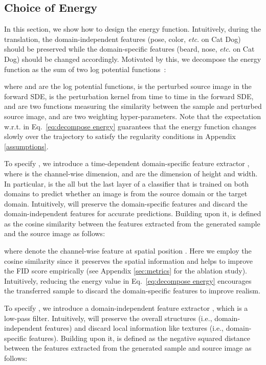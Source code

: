 \documentclass{article}
\begin{document}
\subsection{Choice of Energy}
\label{choice of energy}





In this section, we show how to design the energy function. Intuitively, during the translation, the domain-independent features (pose, color, \emph{etc}. on Cat  Dog) should be preserved while the domain-specific features (beard, nose, \emph{etc}. on Cat  Dog) should be changed  accordingly. Motivated by this, we decompose the energy function  as the sum of two log potential functions~\cite{bishop:2006:PRML}: 

where  and  are the log potential functions,  is the perturbed source image in the forward SDE, 
 is the perturbation kernel from time  to time  in the forward SDE,    and
 are two functions measuring the similarity between the sample and perturbed source image,
and  are two weighting hyper-parameters. Note that
the expectation w.r.t.   in Eq.~\eqref{eq:decompose energy} guarantees that the energy function changes slowly over the trajectory to satisfy the regularity conditions in Appendix \ref{assumptions}. 


To specify 
, we introduce a time-dependent domain-specific feature extractor , where  is the channel-wise dimension,  and  are the dimension of height and width.
In particular,  is the all but the last layer of a classifier that is trained on both domains to predict whether an image is from the source domain or the target domain. Intuitively,   will preserve the domain-specific features and discard the domain-independent features for accurate predictions. Building upon it,  is defined as the cosine similarity between the features extracted from the generated sample and the source image as follows:

where  denote the channel-wise feature at spatial position . Here we employ the cosine similarity since it preserves the spatial information and helps to improve the FID score empirically (see Appendix \ref{sec:metrics} for the ablation study). 
Intuitively, reducing the energy value in Eq.~\eqref{eq:decompose energy} encourages the transferred sample to discard the domain-specific features to improve realism. 


 
To specify , we introduce a  domain-independent feature extractor , which is a low-pass filter.  Intuitively,  will preserve the overall structures (i.e., domain-independent features)
and discard local information like textures (i.e., domain-specific features).    Building upon it,  is defined as the negative squared  distance between the features extracted from the generated sample and source image as follows:
\end{document}
